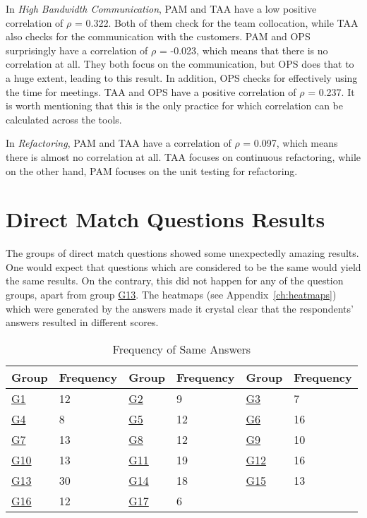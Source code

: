 In \textit{High Bandwidth Communication}, \ac{PAM} and \ac{TAA} have a low positive correlation of $\rho$ = 0.322. Both of them check for the team collocation, while \ac{TAA} also checks for the communication with the customers. \ac{PAM} and \ac{OPS} surprisingly have a correlation of $\rho$ = -0.023, which means that there is no correlation at all. They both focus on the communication, but \ac{OPS} does that to a huge extent, leading to this result. In addition, \ac{OPS} checks for effectively using the time for meetings. \ac{TAA} and \ac{OPS} have a positive correlation of $\rho$ = 0.237. It is worth mentioning that this is the only practice for which correlation can be calculated across the tools.

In \textit{Refactoring}, \ac{PAM} and \ac{TAA} have a correlation of $\rho$ = 0.097, which means there is almost no correlation at all. \ac{TAA} focuses on continuous refactoring, while on the other hand, \ac{PAM} focuses on the unit testing for refactoring.

\section{Direct Match Questions Results}
\label{sec:direct_match_results}

The groups of direct match questions showed some unexpectedly amazing results. One would expect that questions which are considered to be the same would yield the same results. On the contrary, this did not happen for any of the question groups, apart from group \hyperref[G13]{G13}. The heatmaps (see Appendix~\ref{ch:heatmaps}) which were generated by the answers made it crystal clear that the respondents' answers resulted in different scores. 

\begin{table} [H]
	\begin{tabular}{| p{1cm} | p{2cm} | p{1cm} | p{2cm} | p{1cm} | p{2cm} |} \hline
		Group & Frequency & Group & Frequency & Group & Frequency \\ \hline
		\hyperref[G1]{G1} & 12 & \hyperref[G2]{G2} & 9 & \hyperref[G3]{G3} & 7 \\ \hline
		\hyperref[G4]{G4} & 8 & \hyperref[G5]{G5} & 12 & \hyperref[G6]{G6} & 16 \\ \hline
		\hyperref[G7]{G7} & 13 & \hyperref[G8]{G8} & 12 & \hyperref[G9]{G9} & 10 \\ \hline
		\hyperref[G10]{G10} & 13 & \hyperref[G11]{G11} & 19 & \hyperref[G12]{G12} & 16 \\ \hline
		\hyperref[G13]{G13} & 30 & \hyperref[G14]{G14} & 18 & \hyperref[G15]{G15} & 13 \\ \hline
		\hyperref[G16]{G16} & 12 & \hyperref[G17]{G17} & 6 & & \\ \hline
	\end{tabular}
	\caption{Frequency of Same Answers}
	\label{table:answers_frequency}
\end{table}

